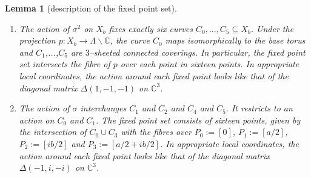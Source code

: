 \documentclass[12pt,reqno]{amsart}
\newtheorem{lem}[thm]{Lemma}
\theoremstyle{definition}
\newcommand{\C}{\mathbb{C}}
\begin{document}
\begin{lem}[description of the fixed point set]\label{lem: fixed points}\,
\begin{enumerate}
    \item The action of $\sigma^2$ on $X_b$ fixes exactly six curves $C_0,...,C_5\subseteq X_b$. Under the projection $p:X_b\to \Lambda\backslash\C$, the curve $C_0$ maps isomorphically to the base torus and $C_1$,...,$C_5$ are $3$--sheeted connected coverings. In particular, the fixed point set intersects the fibre of $p$ over each point in sixteen points. In appropriate local coordinates, the action around each fixed point looks like that of the diagonal matrix $\Delta(1,-1,-1)$ on $\C^3$.
    \item The action of $\sigma$ interchanges $C_1$ and $C_2$ and $C_4$ and $C_5$. It restricts to an action on $C_0$ and $C_1$. The fixed point set consists of sixteen points, given by the intersection of $C_0\cup C_3$ with the fibres over $P_0:=[0]$, $P_1:=[a/2]$, $P_2:=[ib/2]$ and $P_3:=[a/2+ib/2]$. In appropriate local coordinates, the action around each fixed point looks like that of the diagonal matrix $\Delta(-1,i,-i)$ on $\C^3$.
\end{enumerate} 
\end{lem}
\end{document}
